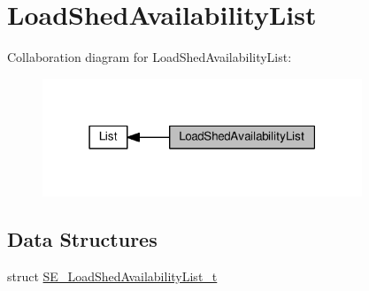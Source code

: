 \hypertarget{group__LoadShedAvailabilityList}{}\section{Load\+Shed\+Availability\+List}
\label{group__LoadShedAvailabilityList}
Collaboration diagram for Load\+Shed\+Availability\+List\+:\nopagebreak
\begin{figure}[H]
\begin{center}
\leavevmode
\includegraphics[width=271pt]{group__LoadShedAvailabilityList}
\end{center}
\end{figure}
\subsection*{Data Structures}
\begin{DoxyCompactItemize}
\item 
struct \hyperlink{structSE__LoadShedAvailabilityList__t}{S\+E\+\_\+\+Load\+Shed\+Availability\+List\+\_\+t}
\end{DoxyCompactItemize}
